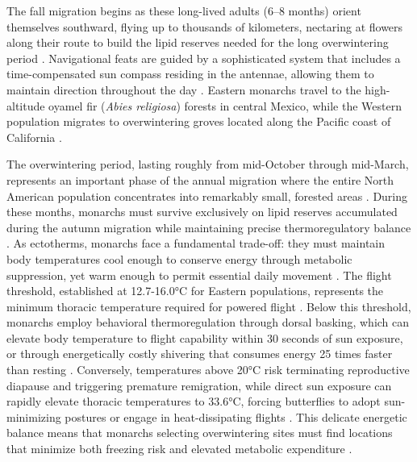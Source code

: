 The fall migration begins as these long-lived adults (6--8 months) orient themselves southward, flying up to thousands of kilometers, nectaring at flowers along their route to build the lipid reserves needed for the long overwintering period \parencite{hermanJuvenileHormoneRegulation2001,chaplinEnergyReservesMetabolic1982,Urquhart1978Autumnal}. Navigational feats are guided by a sophisticated system that includes a time-compensated sun compass residing in the antennae, allowing them to maintain direction throughout the day \parencite{mouritsenVirtualMigrationTethered2002,nguyenSunCompassNeurons2021}. Eastern monarchs travel to the high-altitude oyamel fir (\textit{Abies religiosa}) forests in central Mexico, while the Western population migrates to overwintering groves located along the Pacific coast of California \parencite{browerUnderstandingMisunderstandingMigration1995,Urquhart1978Autumnal}.

The overwintering period, lasting roughly from mid-October through mid-March, represents an important phase of the annual migration where the entire North American population concentrates into remarkably small, forested areas \parencite{solenskyOverviewMonarchMigration2004,vidalDynamicsTrendsOverwintering2014,jepsenUnderstandingConservingWestern2015}. During these months, monarchs must survive exclusively on lipid reserves accumulated during the autumn migration while maintaining precise thermoregulatory balance \parencite{chaplinEnergyReservesMetabolic1982,mastersMonarchButterflyDanaus1988}. As ectotherms, monarchs face a fundamental trade-off: they must maintain body temperatures cool enough to conserve energy through metabolic suppression, yet warm enough to permit essential daily movement \parencite{mastersMonarchButterflyDanaus1988,chaplinEnergyReservesMetabolic1982,kammerThoracicTemperatureShivering1970,alonso-mejiaInfluenceTemperatureSurface1992}. The flight threshold, established at 12.7-16.0°C for Eastern populations, represents the minimum thoracic temperature required for powered flight \parencite{mastersMonarchButterflyDanaus1988}. Below this threshold, monarchs employ behavioral thermoregulation through dorsal basking, which can elevate body temperature to flight capability within 30 seconds of sun exposure, or through energetically costly shivering that consumes energy 25 times faster than resting \parencite{mastersMonarchButterflyDanaus1988}. Conversely, temperatures above 20°C risk terminating reproductive diapause and triggering premature remigration, while direct sun exposure can rapidly elevate thoracic temperatures to 33.6°C, forcing butterflies to adopt sun-minimizing postures or engage in heat-dissipating flights \parencite{barkerEffectPhotoperiodTemperature1976,barkerEffectPhotoperiodTemperature1976}. This delicate energetic balance means that monarchs selecting overwintering sites must find locations that minimize both freezing risk and elevated metabolic expenditure \parencite{mastersMonarchButterflyDanaus1988,alonso-mejiaInfluenceTemperatureSurface1992,calvertEffectRainSnow1983}.

